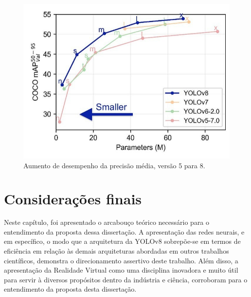 \begin{figure}[!h]
    \center
    \begin{minipage}{0.9\linewidth}
    \center
    \captionsetup{justification=centering,margin=0.5cm,font=small}
    \includegraphics[width=0.7\linewidth]{img/cap2/precisao.png}
    \caption{ Aumento de desempenho da precisão média, versão 5 para 8.  \cite{ultralytics2023yolo}} \label{subfig:precisao}
    \end{minipage}
\end{figure}

\section{Considerações finais}

Neste capítulo, foi apresentado o arcabouço teórico necessário para o entendimento da proposta dessa dissertação. A apresentação das redes neurais, e em específico, o modo que a arquitetura da YOLOv8 sobrepõe-se em termos de eficiência em relação às demais arquiteturas abordadas em outros trabalhos científicos, demonstra o direcionamento assertivo deste trabalho. Além disso, a apresentação da Realidade Virtual como uma disciplina inovadora e muito útil para servir à diversos propósitos dentro da indústria e ciência, corroboram para o entendimento da proposta desta dissertação.


